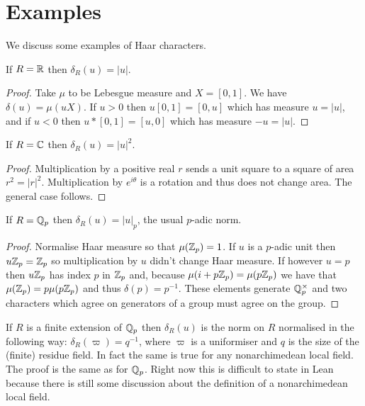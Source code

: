 \section{Examples}

We discuss some examples of Haar characters.

\begin{lemma}
  \label{MeasureTheory.ringHaarChar_real}
  If $R=\mathbb{R}$ then $\delta_R(u)=|u|$.
  \leanok
\end{lemma}
\begin{proof}
  \leanok
  Take $\mu$ to be Lebesgue measure and $X=[0,1]$.
We have $\delta(u)=\mu(uX)$. If $u>0$ then $u[0,1]=[0,u]$ which has measure $u=|u|$,
and if $u<0$ then $u*[0,1]=[u,0]$ which has measure $-u=|u|$.
\end{proof}

\begin{lemma}
  \label{MeasureTheory.ringHaarChar_complex}
  \leanok
  If $R=\mathbb{C}$ then $\delta_R(u)=|u|^2$.
\end{lemma}
\begin{proof}
  \leanok
  Multiplication by a positive real $r$ sends a unit square to a square of area $r^2=|r|^2$.
  Multiplication by $e^{i\theta}$ is a rotation and thus does not change area.
  The general case follows.
\end{proof}

\begin{lemma}
  \label{MeasureTheory.ringHaarChar_padic}
  \leanok
  If $R=\mathbb{Q}_p$ then $\delta_R(u)=|u|_p$, the usual $p$-adic norm.
\end{lemma}
\begin{proof}
  \leanok
  Normalise Haar measure so that $\mu(\mathbb{Z}_p)=1$.
  If $u$ is a $p$-adic unit then $u\mathbb{Z}_p=\mathbb{Z}_p$ so multiplication by $u$ didn't change
  Haar measure. If however $u=p$ then $u\mathbb{Z}_p$ has index $p$ in $\mathbb{Z}_p$ and, because
  $\mu(i+p\mathbb{Z}_p)=\mu(p\mathbb{Z}_p)$ we have that $\mu(\mathbb{Z}_p)=p\mu(p\mathbb{Z}_p)$ and thus $\delta(p)=p^{-1}$.
  These elements generate $\mathbb{Q}_p^\times$ and two characters which agree on generators
  of a group must agree on the group.
\end{proof}

\begin{remark}
If $R$ is a finite extension of $\mathbb{Q}_p$ then $\delta_R(u)$
is the norm on $R$ normalised in the following way:
$\delta_R(\varpi)=q^{-1}$, where $\varpi$ is a uniformiser
and $q$ is the size of the (finite) residue field. In fact the same is true
for any nonarchimedean local field. The proof is
the same as for $\mathbb{Q}_p$. Right now this is difficult to state in Lean because
there is still some discussion about the definition of a nonarchimedean local field.
\end{remark}

